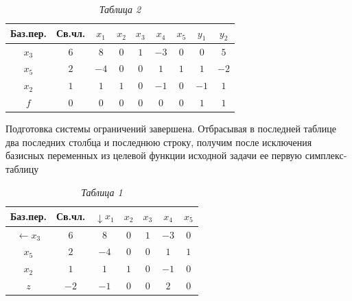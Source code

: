 \begin{table}[h]
\label{table_1_5}
\caption*{\hspace{0.8\linewidth} \textit{Таблица 2}}
\begin{center}
\renewcommand{\tabcolsep}{11,6pt}
\begin{tabular}{ | c | c | c | c | c | c | c | c | c | }
\hline
Баз.пер. & Св.чл. & $x_{1}$ & $x_{2}$ & $x_{3}$ & $x_{4}$ & $x_{5}$ & $y_{1}$ & $y_{2}$\\ \hline
$x_{3}$ & $6$ & $8$ & $0$ & $1$ & $-3$ & $0$ & $0$ & $5$\\ \hline
$x_{5}$ & $2$ & $-4$ & $0$ & $0$ & $1$ & $1$ & $1$ & $-2$\\ \hline
$x_{2}$ & $1$ & $1$ & $1$ & $0$ & $-1$ & $0$ & $-1$ & $1$\\ \hline
$f$ & $0$ & $0$ & $0$ & $0$ & $0$ & $0$ & $1$ & $1$ \\ \hline
\end{tabular}
\end{center}
\end{table}

Подготовка системы ограничений завершена. Отбрасывая в последней таблице два последних столбца и последнюю строку, получим после исключения базисных переменных из целевой функции исходной задачи ее первую симплекс-таблицу

\begin{table}[h]
\label{table_1_6}
\caption*{\hspace{0.8\linewidth} \textit{Таблица 1}}
\begin{center}
\renewcommand{\tabcolsep}{6pt}
\begin{tabular}{ | c | c | c | c | c | c | c | }
\hline
Баз.пер. & Св.чл. & $\downarrow x_{1}$ & $x_{2}$ & $x_{3}$ & $x_{4}$ & $x_{5}$\\ \hline
$\leftarrow x_{3}$ & $6$ & \cellcolor{Gray}$8$ & $0$ & $1$ & $-3$ & $0$\\ \hline
$x_{5}$ & $2$ & $-4$ & $0$ & $0$ & $1$ & $1$\\ \hline
$x_{2}$ & $1$ & $1$ & $1$ & $0$ & $-1$ & $0$ \\ \hline
$z$ & $-2$ & $-1$ & $0$ & $0$ & $2$ & $0$ \\ \hline
\end{tabular}
\end{center}
\end{table}

